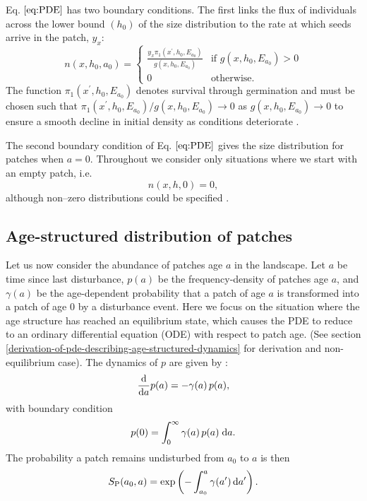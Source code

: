 \documentclass[10pt,twoside]{article}
\begin{document}
Eq. \(\ref{eq:PDE}\) has two boundary conditions. The first links the
flux of individuals across the lower bound \((h_0)\) of the size
distribution to the rate at which seeds arrive in the patch, \(y_x\):
\begin{equation} \label{eq:BC1}
  n(x,h_0,a_0)  = \left\{
  \begin{array}{ll}   \frac{y_x  \pi_1 (x^\prime,h_0, E_{a_0}) }{ g(x,h_0, E_{a_0}) }  & \textrm{if } g(x,h_0, E_{a_0}) > 0 \\
  0 & \textrm{otherwise.}
  \end{array} \right.
\end{equation}
The function \(\pi_1 (x^\prime,h_0, E_{a_0})\) denotes survival through
germination and must be chosen such that
\(\pi_1 (x^\prime,h_0, E_{a_0}) / g(x,h_0, E_{a_0}) \rightarrow 0\) as
\(g(x,h_0, E_{a_0}) \rightarrow 0\) to ensure a smooth decline in
initial density as conditions deteriorate \citep{Falster-2011}.

The second boundary condition of Eq. \(\ref{eq:PDE}\) gives the size
distribution for patches when \(a=0\). Throughout we consider only
situations where we start with an empty patch, i.e.
\begin{equation} \label{eq:BC2} n\left(x,h,0\right) =0,
\end{equation}
although non--zero distributions could be specified
\citep[e.g][]{Moorcroft-2001}.

\subsection{Age-structured distribution of
patches}\label{age-structured-distribution-of-patches}

Let us now consider the abundance of patches age \(a\) in the landscape.
Let \(a\) be time since last disturbance, \(p(a)\) be the
frequency-density of patches age \(a\), and \(\gamma(a)\) be the
age-dependent probability that a patch of age \(a\) is transformed into
a patch of age 0 by a disturbance event. Here we focus on the situation
where the age structure has reached an equilibrium state, which causes
the PDE to reduce to an ordinary differential equation (ODE) with
respect to patch age. (See section
\ref{derivation-of-pde-describing-age-structured-dynamics} for derivation and
non-equilibrium case). The dynamics of \(p\) are given by
\citep{Vonfoerster-1959, Mckendrick-1926}:
\begin{equation} \label{eq:agepde}
\frac{{\rm d}}{{\rm d} a} p(a)  = -\gamma(a) \, p(a) ,
\end{equation}
with boundary condition
\begin{equation}  p(0)  = \int_0^\infty \gamma(a) \, p(a) \; {\rm d} a.
\end{equation}
The probability a patch remains undisturbed from \(a_0\) to \(a\) is
then
\begin{equation} \label{eq:survivalPatch}
  S_{\rm P} (a_0,a) = \exp\left(-\int_{a_0}^{a} \gamma(a^\prime) \, {\rm d} a^\prime \right).
\end{equation}
\end{document}

